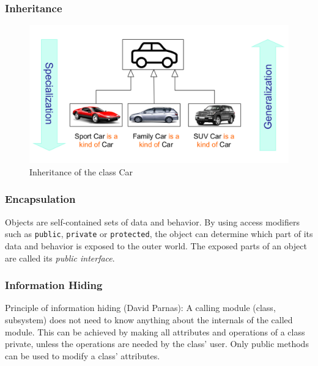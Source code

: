 \subsubsection*{Inheritance}
\begin{figure}[h!]
	\centering
	\includegraphics[width=\linewidth]{images/oop_inheritance_example}
	\caption{Inheritance of the class \glqq Car\grqq}
\end{figure}

\subsubsection*{Encapsulation}
Objects are self-contained sets of data and behavior.
By using access modifiers such as \texttt{public}, \texttt{private} or \texttt{protected}, the object can determine which part of its data and behavior is exposed to the outer world.
The exposed parts of an object are called its \textit{public interface}.

\subsubsection*{Information Hiding}
Principle of information hiding (David Parnas):
A calling module (class, subsystem) does not need to know anything about the internals of the called module.
This can be achieved by making all attributes and operations of a class private, unless the operations are needed by the class' user.
Only public methods can be used to modify a class' attributes.

